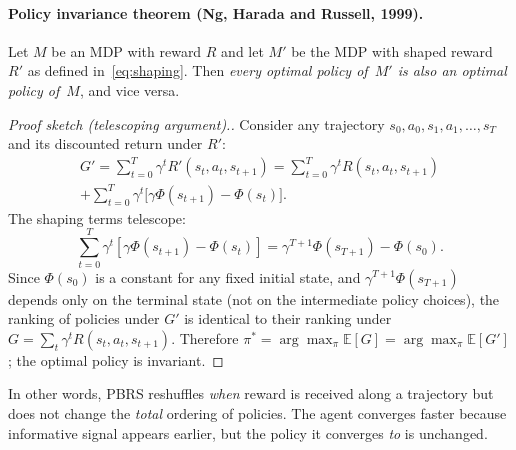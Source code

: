 \documentclass[letterpaper, 10 pt, conference]{ieeeconf}  %
\begin{document}
\paragraph{Policy invariance theorem (Ng, Harada and Russell, 1999).}
Let $M$ be an MDP with reward $R$ and let $M'$ be the MDP with shaped reward $R'$ as defined in~\eqref{eq:shaping}.
Then \emph{every optimal policy of~$M'$ is also an optimal policy of~$M$}, and vice versa.

\begin{proof}[Proof sketch (telescoping argument).]
Consider any trajectory $s_0, a_0, s_1, a_1, \ldots, s_T$ and its discounted return under $R'$:
\begin{multline}
\label{eq:telescope1}
G' = \sum_{t=0}^{T} \gamma^t R'(s_t, a_t, s_{t+1})
     = \sum_{t=0}^{T} \gamma^t R(s_t, a_t, s_{t+1})\\
       + \sum_{t=0}^{T} \gamma^t\bigl[\gamma\Phi(s_{t+1}) - \Phi(s_t)\bigr].
\end{multline}
The shaping terms telescope:
\begin{equation}
\label{eq:telescope2}
\sum_{t=0}^{T} \gamma^t[\gamma\Phi(s_{t+1}) - \Phi(s_t)]
  = \gamma^{T+1}\Phi(s_{T+1}) - \Phi(s_0).
\end{equation}
Since $\Phi(s_0)$ is a constant for any fixed initial state, and $\gamma^{T+1}\Phi(s_{T+1})$ depends only on the terminal state (not on the intermediate policy choices), the ranking of policies under $G'$ is identical to their ranking under~$G = \sum_t \gamma^t R(s_t,a_t,s_{t+1})$.
Therefore $\pi^* = \arg\max_\pi \mathbb{E}[G] = \arg\max_\pi \mathbb{E}[G']$; the optimal policy is invariant.
\end{proof}

In other words, PBRS reshuffles \emph{when} reward is received along a trajectory but does not change the \emph{total} ordering of policies. The agent converges faster because informative signal appears earlier, but the policy it converges \emph{to} is unchanged.
\end{document}
